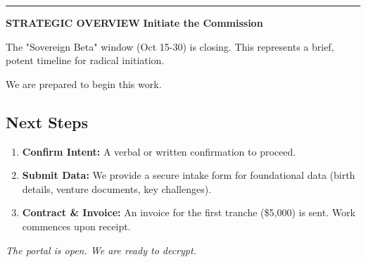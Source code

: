 \documentclass[11pt, a4paper]{article}
\newcommand{\decksection}[1]{
    \par
    \vspace{0.7cm}
    \textcolor{Emerald}{\rule{\linewidth}{1pt}}
    \vspace{0.2cm}
    \noindent\textcolor{Emerald}{\fontsize{10}{12}\selectfont\textbf{STRATEGIC OVERVIEW}}
    \noindent\fontsize{24}{28}\selectfont\textbf{#1}
    \vspace{0.5cm}
}
\begin{document}
\newpage

\decksection{Initiate the Commission}

The "Sovereign Beta" window (Oct 15-30) is closing. This represents a brief, potent timeline for radical initiation.

We are prepared to begin this work.

\vspace{1cm}

\begin{figure}[htbp]
  \centering
\end{figure}

\vspace{1cm}

\subsection*{Next Steps}
\begin{enumerate}
    \item \textbf{Confirm Intent:} A verbal or written confirmation to proceed.
    \item \textbf{Submit Data:} We provide a secure intake form for foundational data (birth details, venture documents, key challenges).
    \item \textbf{Contract \& Invoice:} An invoice for the first tranche (\$5,000) is sent. Work commences upon receipt.
\end{enumerate}

\vspace{1.5cm}
\centerline{\textit{The portal is open. We are ready to decrypt.}}
\end{document}
